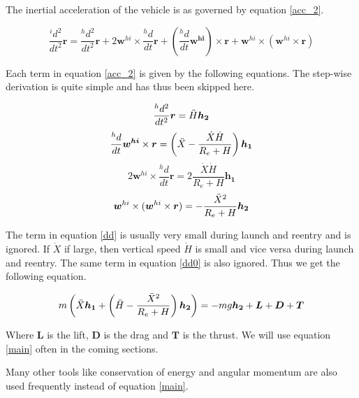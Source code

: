 \documentclass{article}
\theoremstyle{definition}
\begin{document}
The inertial acceleration of the vehicle is as governed by equation \ref{acc_2}. 

\begin{equation}\label{acc_2}
    \frac{^{i}d^2}{dt^2}\boldsymbol{r}= \frac{^{h}d^2}{dt^2}\boldsymbol{r} + 
  2\boldsymbol w^{hi}\times \frac{^{h}d}{dt}\boldsymbol{r} + \left(\frac{^{h}d}{dt}\boldsymbol{w^{hi}}\right)\times \boldsymbol{r} + \boldsymbol w^{hi} \times ( \boldsymbol w^{hi} \times \boldsymbol{r})
\end{equation}

Each term in equation \ref{acc_2} is given by the following equations. The step-wise derivation is quite simple and has thus been skipped here.

\begin{equation}
    \frac{^{h}d^2}{dt^2}\boldsymbol{r} = \Ddot{H}\boldsymbol{h_2}
\end{equation}
\begin{equation}\label{dd0}
    \frac{^{h}d}{dt}\boldsymbol{w^{hi}}\times \boldsymbol{r}= \left(\Ddot{X} - \frac{\Dot{X}\Dot{H}}{R_e + H}\right)\boldsymbol{h_1}
\end{equation}
\begin{equation}\label{dd}
    2\boldsymbol w^{hi}\times \frac{^{h}d}{dt}\boldsymbol{r}= 2\frac{\Dot{X}\Dot{H}}{R_e + H}\boldsymbol{h_1}
\end{equation}
\begin{equation}
    \boldsymbol w^{hi} \times ( \boldsymbol w^{hi} \times \boldsymbol{r})= -\frac{\Ddot{X}^2}{R_e + H}\boldsymbol{h_2}
\end{equation}

The term in equation \ref{dd} is usually very small during launch and reentry and is ignored. If $\Dot{X}$ if large, then vertical speed $\Dot{H}$ is small and vice versa during launch and reentry. The same term in equation \ref{dd0} is also ignored. Thus we get the following equation.

\begin{equation}\label{main}
    m\left(\Ddot{X}\boldsymbol{h_1} + \left(\Ddot{H} - \frac{\Ddot{X}^2}{R_e + H}\right)\boldsymbol{h_2} \right) = -mg\boldsymbol{h_2} + \boldsymbol{L} + \boldsymbol{D} + \boldsymbol{T}
\end{equation}

Where $\boldsymbol{L}$ is the lift, $\boldsymbol{D}$ is the drag and $\boldsymbol{T}$ is the thrust. We will use equation \ref{main} often in the coming sections. 

Many other tools like conservation of energy and angular momentum are also used frequently instead of equation \ref{main}.
\end{document}
